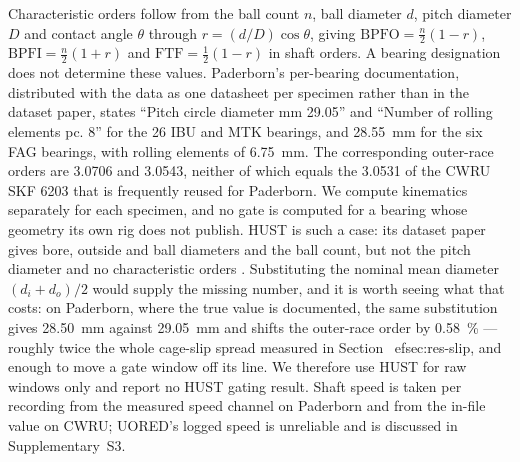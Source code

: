 Characteristic orders follow from the ball count $n$, ball diameter $d$, pitch diameter $D$ and contact angle $\theta$
through $r=(d/D)\cos\theta$, giving $\mathrm{BPFO}=\tfrac{n}{2}(1-r)$, $\mathrm{BPFI}=\tfrac{n}{2}(1+r)$ and
$\mathrm{FTF}=\tfrac{1}{2}(1-r)$ in shaft orders. A bearing designation does not determine these values. Paderborn's
per-bearing documentation, distributed with the data as one datasheet per specimen rather than in the dataset paper, states
``Pitch circle diameter mm 29.05'' and ``Number of rolling elements pc. 8'' for the 26 IBU and MTK bearings, and
\SI{28.55}{\milli\metre} for the six FAG bearings, with rolling elements of \SI{6.75}{\milli\metre}. The corresponding
outer-race orders are 3.0706 and 3.0543, neither of which equals the 3.0531 of the CWRU SKF 6203 that is frequently reused
for Paderborn. We compute kinematics separately for each specimen, and no gate is computed for a bearing whose geometry its own rig does
not publish. HUST is such a case: its dataset paper gives bore, outside and ball diameters and the ball count, but not the
pitch diameter and no characteristic orders \cite{thuan2023hust}. Substituting the nominal mean diameter $(d_i+d_o)/2$
would supply the missing number, and it is worth seeing what that costs: on Paderborn, where the true value is documented,
the same substitution gives \SI{28.50}{\milli\metre} against \SI{29.05}{\milli\metre} and shifts the outer-race order by
\SI{0.58}{\percent} --- roughly twice the whole cage-slip spread measured in Section~
ef{sec:res-slip}, and enough to move
a gate window off its line. We therefore use HUST for raw windows only and report no HUST gating result. Shaft speed is taken per recording from the measured speed channel on Paderborn and from the in-file value
on CWRU; UORED's logged speed is unreliable and is discussed in Supplementary~S3.
